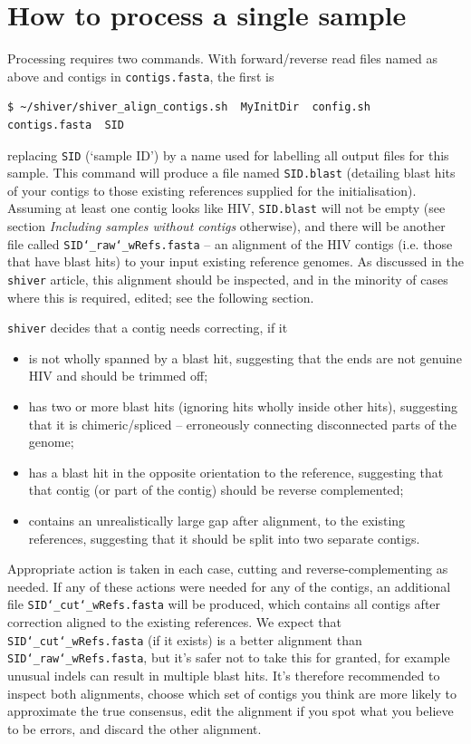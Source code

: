 \documentclass{article}
\newcommand{\shiv}{\texttt{shiver}\xspace}
\let\c\texttt
\begin{document}
\section{How to process a single sample}
Processing requires two commands.
With forward/reverse read files named as above and contigs in \c{contigs.fasta}, the first is  
\begin{Verbatim}[samepage=true]
$ ~/shiver/shiver_align_contigs.sh  MyInitDir  config.sh  contigs.fasta  SID
\end{Verbatim}
replacing \c{SID} (`sample ID') by a name used for labelling all output files for this sample.
This command will produce a file named \c{SID.blast} (detailing blast hits of your contigs to those existing references supplied for the initialisation).
Assuming at least one contig looks like HIV, \c{SID.blast} will not be empty (see section {\it Including samples without contigs} otherwise), and there will be another file called \c{SID\char`_raw\char`_wRefs.fasta} -- an alignment of the HIV contigs (i.e. those that have blast hits) to your input existing reference genomes.
As discussed in the \shiv article, this alignment should be inspected, and in the minority of cases where this is required, edited; see the following section.

\shiv decides that a contig needs correcting, if it
\begin{itemize}
 \item is not wholly spanned by a blast hit, suggesting that the ends are not genuine HIV and should be trimmed off;
 \item has two or more blast hits (ignoring hits wholly inside other hits), suggesting that it is chimeric/spliced -- erroneously connecting disconnected parts of the genome;
 \item has a blast hit in the opposite orientation to the reference, suggesting that that contig (or part of the contig) should be reverse complemented;
 \item contains an unrealistically large gap after alignment, to the existing references, suggesting that it should be split into two separate contigs.
\end{itemize}
Appropriate action is taken in each case, cutting and reverse-complementing as needed.
If any of these actions were needed for any of the contigs, an additional file \c{SID\char`_cut\char`_wRefs.fasta} will be produced, which contains all contigs after correction aligned to the existing references.
We expect that \c{SID\char`_cut\char`_wRefs.fasta} (if it exists) is a better alignment than \c{SID\char`_raw\char`_wRefs.fasta}, but it's safer not to take this for granted, for example unusual indels can result in multiple blast hits.
It's therefore recommended to inspect both alignments, choose which set of contigs you think are more likely to approximate the true consensus, edit the alignment if you spot what you believe to be errors, and discard the other alignment. 
\end{document}
